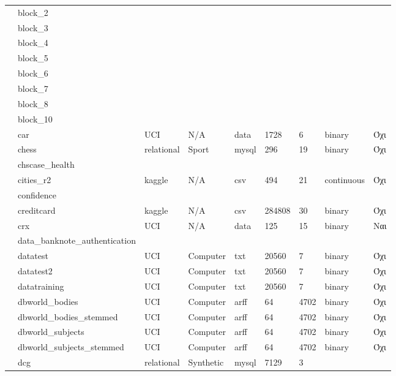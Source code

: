 \begin{longtable}{| p{} | p{}| p{} | p{} | p{} | p{} | p{} | p{} | p{} | }
 			\rownumber & block\_2 & & & & & & & \\
 			\rownumber & block\_3 & & & & & & & \\
 			\rownumber & block\_4 & & & & & & & \\
 			\rownumber & block\_5 & & & & & & & \\
 			\rownumber & block\_6 & & & & & & & \\
 			\rownumber & block\_7 & & & & & & & \\
 			\rownumber & block\_8 & & & & & & & \\
 			\rownumber & block\_10 & & & & & & & \\
 			\rownumber & car \citep{car} & UCI & N/A & data & 1728 & 6  & binary & Όχι\\
 			\rownumber & chess & relational & Sport & mysql  & 296 & 19 & binary & Όχι \\
 			\rownumber & chscase\_health & & & & & & & \\
 			\rownumber & cities\_r2 \citep{indian} & kaggle & N/A & csv & 494 & 21 & continuous & Όχι \\
 			\rownumber & confidence & & & & & & & \\
 			\rownumber & creditcard \citep{creditcard,} & kaggle & N/A & csv & 284808 & 30 & binary & Όχι \\
 			\rownumber & crx \citep{credit}  & UCI & N/A & data & 125 & 15 & binary & Ναι \\
 			\rownumber & data\_banknote\_authentication & & & & & & & \\
 			\rownumber & datatest & UCI & Computer & txt & 20560 & 7 & binary & Όχι \\
 			\rownumber & datatest2 & UCI & Computer & txt & 20560 & 7 & binary & Όχι \\
 			\rownumber & datatraining & UCI & Computer & txt & 20560 & 7 & binary & Όχι \\
 			\rownumber & dbworld\_bodies & UCI & Computer & arff & 64 & 4702 & binary & Όχι \\
 			\rownumber & dbworld\_bodies\_stemmed & UCI & Computer & arff & 64 & 4702 & binary & Όχι \\
 			\rownumber & dbworld\_subjects & UCI & Computer & arff & 64 & 4702 & binary & Όχι \\
 			\rownumber & dbworld\_subjects\_stemmed & UCI & Computer & arff & 64 & 4702 & binary & Όχι \\
 			\rownumber & dcg \citep{dcg} & relational & Synthetic & mysql & 7129 & 3 & & \\

\end{longtable}
